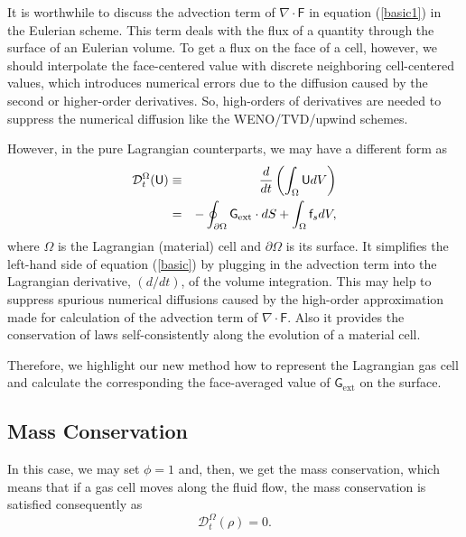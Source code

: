 \documentclass[twocolumn]{aastex63}
\begin{document}
It is worthwhile to discuss the advection term of $\nabla\cdot \mathsf{F}$ in equation (\ref{basic1}) in the Eulerian scheme. This term deals with the flux of a quantity through the surface of an Eulerian volume. To get a flux on the face of a cell, however, we should interpolate the face-centered value with discrete neighboring cell-centered values, which introduces numerical errors due to the diffusion caused by the second or higher-order derivatives. So, high-orders of derivatives are needed to suppress the numerical diffusion like the WENO/TVD/upwind schemes.

However, in the pure Lagrangian counterparts, we may have a different form as
\begin{eqnarray} \label{lag}
	\mathcal{D}_t^\Omega (\mathsf{U}) &\equiv&	 {d\over dt} \left(\int_\Omega \mathsf{U} dV\right) \\ &=& -\oint_{\partial \Omega}{\mathsf{G}}_\textrm{ext}\cdot dS + \int_\Omega\mathsf{f}_s dV,
\end{eqnarray}
where $\Omega$ is the Lagrangian (material) cell and $\partial\Omega$ is its surface. It simplifies the left-hand side of equation (\ref{basic}) by plugging in  the advection term into the Lagrangian derivative, $(d/dt)$, of the volume integration.  This may help to suppress spurious numerical diffusions caused by the high-order approximation made for calculation of the advection term of $\nabla\cdot \mathsf{F}$. Also it provides the conservation of laws self-consistently along the evolution of a material cell.


Therefore, we highlight our new method how to represent the Lagrangian gas cell and calculate the corresponding the face-averaged value of $\mathsf{G}_\textrm{ext}$ on the surface.



\subsection{Mass Conservation}
In this case, we may set $\phi = 1$ and, then, we get the mass conservation, which means that if a gas cell moves along the fluid flow, the mass conservation is satisfied consequently as
\begin{equation}
	\mathcal{D}_t^\Omega(\rho) = 0.
\end{equation}
\end{document}
